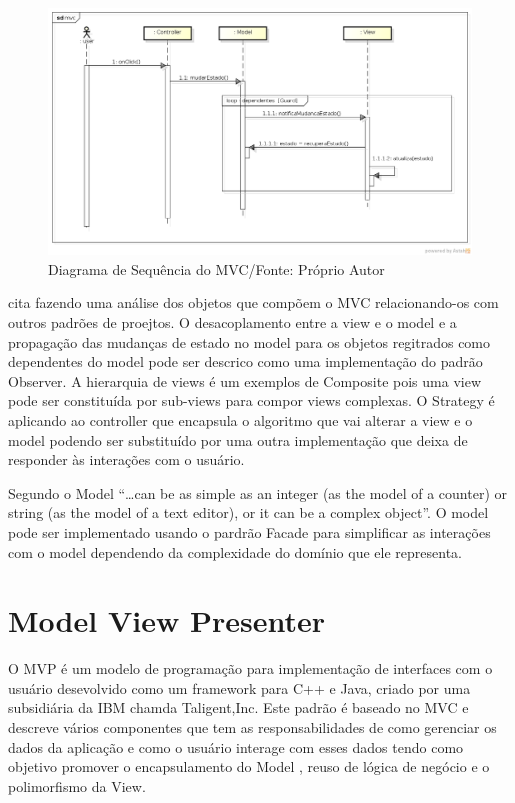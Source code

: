 \begin{figure}[h]
	\centering
	\includegraphics[scale=0.5]{img/mvc_seq.png}
	\caption{Diagrama de Sequência do MVC/Fonte: Próprio Autor}
	\label{mvc_seq}
\end{figure}

 cita  fazendo uma análise dos
objetos que compõem o MVC relacionando-os com outros padrões de proejtos. O
desacoplamento entre a view e o model e a propagação das mudanças de estado no
model para os objetos regitrados como dependentes do model pode ser descrico
como uma implementação do padrão Observer. A hierarquia de views é um exemplos
de Composite pois uma view pode ser constituída por sub-views para compor views
complexas. O Strategy é aplicando ao controller que encapsula o algoritmo que
vai alterar a view e o model podendo ser substituído por uma outra
implementação que deixa de responder às interações com o usuário.

Segundo  o Model ``\ldots can be as simple as an integer
(as the model of a counter) or string (as the model of a text editor), or it can
be a complex object''. O model pode ser implementado usando o pardrão Facade
para simplificar as interações com o model dependendo da complexidade do
domínio que ele representa.



\section{Model View Presenter}

O MVP é um modelo de programação para implementação de interfaces com o usuário
desevolvido como um framework para C++ e Java, criado por uma subsidiária da IBM
chamda Taligent,Inc. Este padrão é baseado no MVC e descreve vários componentes que tem as
responsabilidades de como gerenciar os dados da aplicação e como o usuário
interage com esses dados tendo como objetivo promover o encapsulamento do Model
, reuso de lógica de negócio e o polimorfismo da View.

